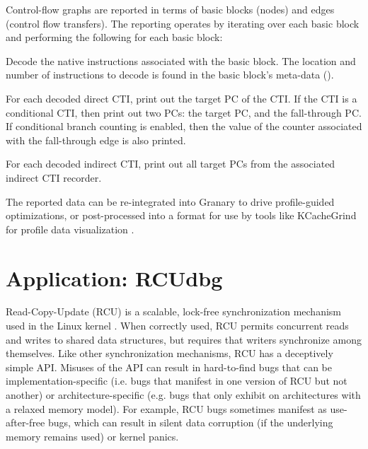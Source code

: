 \documentclass[preprint]{sigplanconf}
\newenvironment{enumerate*}%
  {\begin{enumerate}%
    \setlength{\itemsep}{2pt}%
    \setlength{\parskip}{0pt}}%
  {\end{enumerate}}
\newcommand{\toolname}[1]{{\scshape #1}}
\begin{document}
Control-flow graphs are reported in terms of basic blocks (nodes) and edges (control flow transfers). The reporting operates by iterating over each basic block and performing the following for each basic block: \begin{enumerate*}
	\item Decode the native instructions associated with the basic block. The location and number of instructions to decode is found in the basic block's meta-data ().
	\item For each decoded direct CTI, print out the target PC of the CTI. If the CTI is a conditional CTI, then print out two PCs: the target PC, and the fall-through PC. If conditional branch counting is enabled, then the value of the counter associated with the fall-through edge is also printed.
	\item For each decoded indirect CTI, print out all target PCs from the associated indirect CTI recorder.
\end{enumerate*}

The reported data can be re-integrated into Granary to drive profile-guided optimizations, or post-processed into a format for use by tools like KCacheGrind for profile data visualization \cite{KCacheGrind}.





\section{Application: RCUdbg}\label{sec:rcudbg}

Read-Copy-Update (RCU) is a scalable, lock-free synchronization mechanism used in the Linux kernel \cite{RCU,RCUInLinux}. When correctly used, RCU permits concurrent reads and writes to shared data structures, but requires that writers synchronize among themselves. Like other synchronization mechanisms, RCU has a deceptively simple API. Misuses of the API can result in hard-to-find bugs that can be implementation-specific (i.e. bugs that manifest in one version of RCU but not another) or architecture-specific (e.g. bugs that only exhibit on architectures with a relaxed memory model). For example, RCU bugs sometimes manifest as use-after-free bugs, which can result in silent data corruption (if the underlying memory remains used) or kernel panics. 
\end{document}

